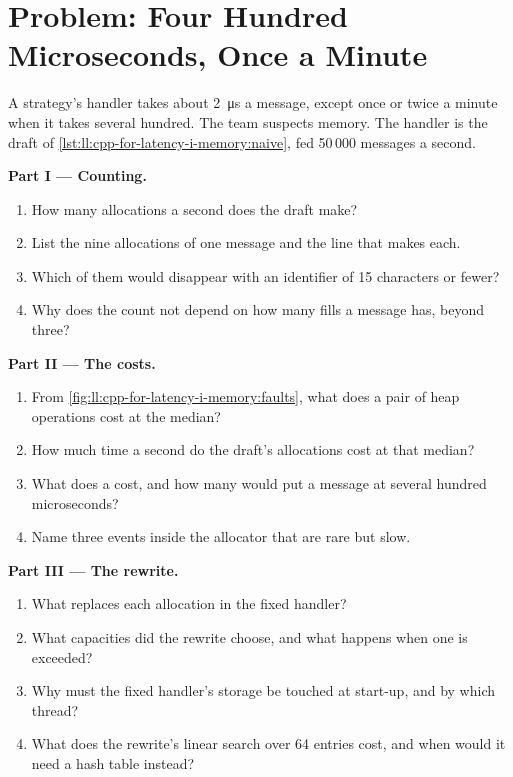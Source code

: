 \section{Problem: Four Hundred Microseconds, Once a Minute}

\begin{problem}\label{pb:ll:cpp-for-latency-i-memory:1}
A strategy's handler takes about \qty{2}{\micro\second} a message, except once or twice a minute when it takes several
hundred. The team suspects memory. The handler is the draft of \cref{lst:ll:cpp-for-latency-i-memory:naive}, fed 50\,000
messages a second.

\medskip\noindent\textbf{Part I --- Counting.}
\begin{enumerate}
\item How many allocations a second does the draft make?
\item List the nine allocations of one message and the line that makes each.
\item Which of them would disappear with an identifier of 15 characters or fewer?
\item Why does the count not depend on how many fills a message has, beyond three?
\end{enumerate}

\medskip\noindent\textbf{Part II --- The costs.}
\begin{enumerate}[resume]
\item From \cref{fig:ll:cpp-for-latency-i-memory:faults}, what does a pair of heap operations cost at the median?
\item How much time a second do the draft's allocations cost at that median?
\item What does a  cost, and how many would put a message at several hundred microseconds?
\item Name three events inside the allocator that are rare but slow.
\end{enumerate}

\medskip\noindent\textbf{Part III --- The rewrite.}
\begin{enumerate}[resume]
\item What replaces each allocation in the fixed handler?
\item What capacities did the rewrite choose, and what happens when one is exceeded?
\item Why must the fixed handler's storage be touched at start-up, and by which thread?
\item What does the rewrite's linear search over 64 entries cost, and when would it need a hash table instead?
\end{enumerate}


\end{problem}
